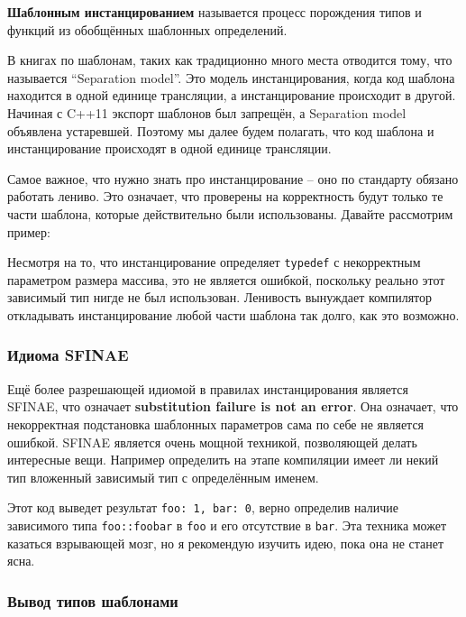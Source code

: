\documentclass[a4paper,12pt,oneside]{article}
\begin{document}
\textbf{Шаблонным инстанцированием} называется процесс порождения типов и функций из обобщённых шаблонных определений.

В книгах по шаблонам, таких как \cite{vandervoord} традиционно много места отводится тому, что называется ``Separation model''. Это модель инстанцирования, когда код шаблона находится в одной единице трансляции, а инстанцирование происходит в другой. Начиная с C++11 \cite{stdcpp11} экспорт шаблонов был запрещён, а Separation model объявлена устаревшей. Поэтому мы далее будем полагать, что код шаблона и инстанцирование происходят в одной единице трансляции.

Самое важное, что нужно знать про инстанцирование -- оно по стандарту обязано работать лениво. Это означает, что проверены на корректность будут только те части шаблона, которые действительно были использованы. Давайте рассмотрим пример:



Несмотря на то, что инстанцирование определяет \lstinline!typedef! с некорректным параметром размера массива, это не является ошибкой, поскольку реально этот зависимый тип нигде не был использован. Ленивость вынуждает компилятор откладывать инстанцирование любой части шаблона так долго, как это возможно.

\subsubsection{Идиома SFINAE}\label{SFINAE}

Ещё более разрешающей идиомой в правилах инстанцирования является SFINAE, что означает \textbf{substitution failure is not an error}. Она означает, что некорректная подстановка шаблонных параметров сама по себе не является ошибкой. SFINAE является очень мощной техникой, позволяющей делать интересные вещи. Например определить на этапе компиляции имеет ли некий тип вложенный зависимый тип с определённым именем.



Этот код выведет результат \lstinline!foo: 1, bar: 0!, верно определив наличие зависимого типа \lstinline!foo::foobar! в \lstinline!foo! и его отсутствие в \lstinline!bar!. Эта техника может казаться взрывающей мозг, но я рекомендую изучить идею, пока она не станет ясна.

\subsubsection{Вывод типов шаблонами}\label{TemplateInference}
\end{document}
